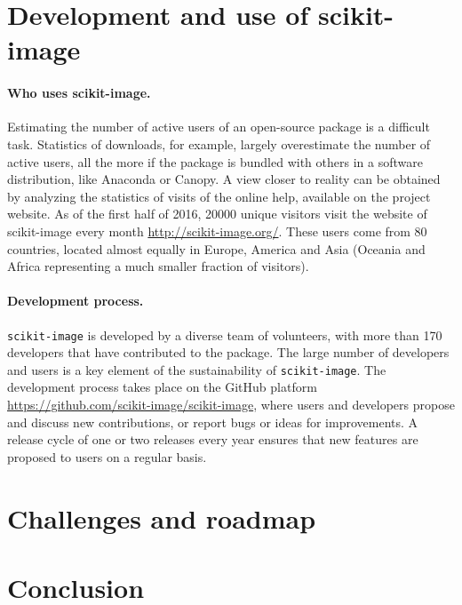 \documentclass[twocolumn]{bmcart}%
\begin{document}
\section*{Development and use of scikit-image}

\paragraph{Who uses scikit-image.}

Estimating the number of active users of an open-source package is a
difficult task. Statistics of downloads, for example, largely
overestimate the number of active users, all the more if the package is
bundled with others in a software distribution, like Anaconda or
Canopy. A view closer to reality can be obtained by analyzing the
statistics of visits of the online help, available on the project
website.  As of the first half of 2016, 20000 unique visitors visit the
website of scikit-image every month \url{http://scikit-image.org/}. These
users come from 80 countries, located almost equally in Europe, America
and Asia (Oceania and Africa representing a much smaller fraction of
visitors).

\paragraph{Development process.}

\texttt{scikit-image} is developed by a diverse team of volunteers, with
more than 170 developers that have contributed to the package. The large
number of developers and users is a key element of the sustainability of
\texttt{scikit-image}. The
development process takes place on the GitHub platform
\url{https://github.com/scikit-image/scikit-image}, where users and
developers propose and discuss new contributions, or report bugs or ideas
for improvements.
A release cycle of one or two releases every year
ensures that new features are proposed to users on a regular basis.

\section*{Challenges and roadmap}

\section*{Conclusion}



\end{document}
